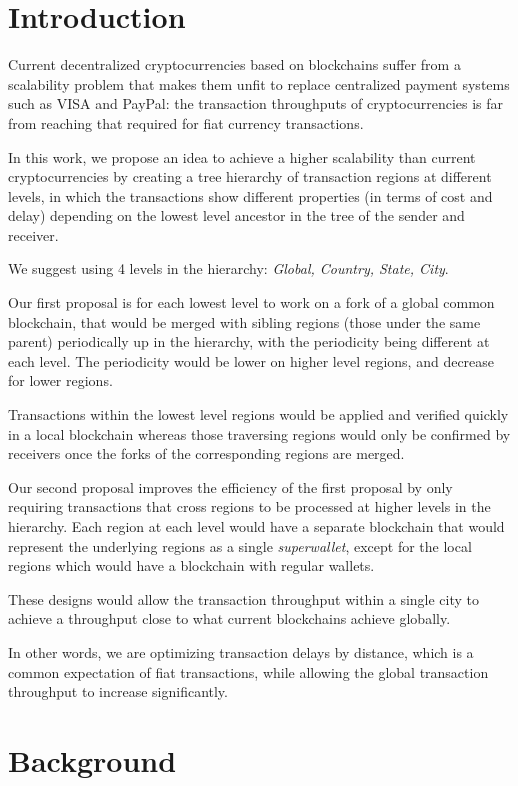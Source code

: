 \section{Introduction}

Current decentralized cryptocurrencies based on blockchains suffer from a
scalability problem that makes them unfit to replace centralized payment
systems such as VISA and PayPal: the transaction throughputs of
cryptocurrencies is far from reaching that required for fiat currency
transactions.

In this work, we propose an idea to achieve a higher scalability than current
cryptocurrencies by creating a tree hierarchy of transaction regions at
different levels, in which the transactions show different properties (in terms
of cost and delay) depending on the lowest level ancestor in the tree of
the sender and receiver.

We suggest using 4 levels in the hierarchy: \textit{Global, Country, State, City}.

Our first proposal is for each lowest level to work on a fork of a global
common blockchain, that would be merged with sibling regions (those under the
same parent) periodically up in the hierarchy, with the periodicity being
different at each level.  The periodicity would be lower on higher level regions,
and decrease for lower regions.

Transactions within the lowest level regions would be applied and verified
quickly in a local blockchain whereas those traversing regions would only be
confirmed by receivers once the forks of the corresponding regions are merged.

Our second proposal improves the efficiency of the first proposal by only
requiring transactions that cross regions to be processed at higher levels in
the hierarchy.  Each region at each level would have a separate blockchain that
would represent the underlying regions as a single \textit{superwallet}, except
for the local regions which would have a blockchain with regular wallets.

These designs would allow the transaction throughput within a single city to
achieve a throughput close to what current blockchains achieve globally.

In other words, we are optimizing transaction delays by distance, which is a
common expectation of fiat transactions, while allowing the global transaction
throughput to increase significantly.

\section{Background}

